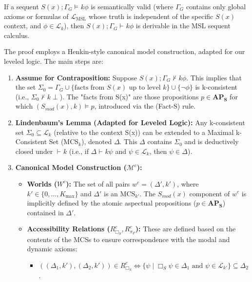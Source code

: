 \documentclass[
    12pt,              %
    a4paper,           %
    headings=normal,   %
    twoside=true,      %
    BCOR=8mm,          %
]{scrbook}
\newcommand{\Smodx}{S_{mod}(x)}
\newcommand{\LMSL}{\mathcal{L}_{\text{MSL}}}
\newcommand{\BoxS}{\Box_S}
\newcommand{\turnstilek}[1][]{\vdash^{#1}}
\newcommand{\Kmax}{K_{\text{max}}}
\newcommand{\APS}{\mathbf{AP_S}}
\newcommand{\modelsk}[1][]{\vDash^{#1}}
\newcommand{\MCS}{\text{MCS}}
\begin{document}
\begin{mytheorem}
If a sequent \(S(x); \Gamma_G \modelsk{k} \phi\) is semantically valid (where \(\Gamma_G\) contains only global axioms or formulas of \(\LMSL\) whose truth is independent of the specific \(S(x)\) context, and \(\phi \in \mathcal{L}_k\)), then \(S(x); \Gamma_G \turnstilek{k} \phi\) is derivable in the MSL sequent calculus.
\end{mytheorem}

\begin{myproof}
The proof employs a Henkin-style canonical model construction, adapted for our leveled logic. The main steps are:

\begin{enumerate}[label=\arabic*.]
    \item  \textbf{Assume for Contraposition:} Suppose \(S(x); \Gamma_G \not\turnstilek{k} \phi\). This implies that the set \(\Sigma_0 = \Gamma_G \cup \{\text{facts from } S(x) \text{ up to level } k\} \cup \{\neg\phi\}\) is k-consistent (i.e., \(\Sigma_0 \not\turnstilek{k} \perp\)). The "facts from S(x)" are those propositions \(p \in \APS\) for which \((\Smodx, k) \vDash p\), introduced via the (Fact-S) rule.
    \item  \textbf{Lindenbaum's Lemma (Adapted for Leveled Logic):} Any k-consistent set \(\Sigma_0 \subseteq \mathcal{L}_k\) (relative to the context S(x)) can be extended to a Maximal k-Consistent Set (\(\MCS_k\)), denoted \(\Delta\). This \(\Delta\) contains \(\Sigma_0\) and is deductively closed under \(\turnstilek{k}\) (i.e., if \(\Delta \turnstilek{k} \psi\) and \(\psi \in \mathcal{L}_k\), then \(\psi \in \Delta\)).
    \item  \textbf{Canonical Model Construction (\(\mathcal{M}^c\)):}
        \begin{itemize}
            \item   \textbf{Worlds (\(W^c\)):} The set of all pairs \(w^c = (\Delta', k')\), where \(k' \in \{0, \dots, \Kmax\}\) and \(\Delta'\) is an \(\MCS_{k'}\). The \(\Smodx\) component of \(w^c\) is implicitly defined by the atomic aspectual propositions (\(p \in \APS\)) contained in \(\Delta'\).
            \item   \textbf{Accessibility Relations (\(R^c_{\BoxS}, R^c_{\pi_F}\)):} These are defined based on the contents of the MCSs to ensure correspondence with the modal and dynamic axioms:
                \begin{itemize}
                    \item   \( ((\Delta_1, k'), (\Delta_2, k')) \in R^c_{\BoxS} \iff \{\psi \mid \BoxS\psi \in \Delta_1 \text{ and } \psi \in \mathcal{L}_{k'}\} \subseteq \Delta_2\).

\end{itemize}
\end{itemize}
\end{enumerate}
\end{myproof}
\end{document}
